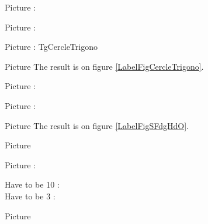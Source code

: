 

Picture : 
\begin{center}
   
\end{center}


Picture : 
\begin{center}
   
\end{center}

Picture : TgCercleTrigono
\begin{center}
   
\end{center}

\clearpage

Picture 
The result is on figure \ref{LabelFigCercleTrigono}. %
\newcommand{\CaptionFigCercleTrigono}{<+Type your caption here+>}




Picture : 
\begin{center}
   
\end{center}


Picture : 
\begin{center}
   
\end{center}

\clearpage


Picture 
The result is on figure \ref{LabelFigSFdgHdO}. %
\newcommand{\CaptionFigSFdgHdO}{<+Type your caption here+>}


\clearpage

       Picture 
   \begin{center}

   \end{center}



\setcounter{page}{10}
\setcounter{section}{3}
Picture : 
\begin{center}
    Have to be 10 : \thepage\\
    Have to be 3 : \thesection\\
   
\end{center}


       Picture 
   \begin{center}

   \end{center}



